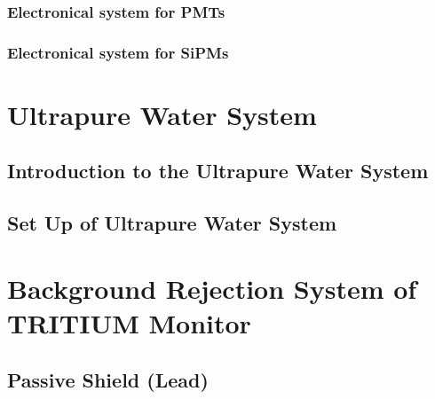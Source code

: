 \documentclass[12pt,a4paper]{book}
\begin{document}
			\subsubsection[Electronic Readout for PMTs]{Electronical system for PMTs}\label{subsubsec:PMTsElectronicalSystem}
			
			
			\subsubsection[Electronic Readout for SiPMs]{Electronical system for SiPMs}\label{subsubsec:SiPMsElectronicalSystem}
			
		
	\section{Ultrapure Water System}\label{sec:UltraPureWaterSystem}
		
		\subsection[Introduction to the Water System]{Introduction to the Ultrapure Water System}\label{subsec:IntroductionWaterSystem}
		 
					
		\subsection[Water System Set Up]{Set Up of Ultrapure Water System}\label{subsec:SetUpWaterSystem}
		
	
	\section[Background Rejection System]{Background Rejection System of TRITIUM Monitor}\label{sec:IntroductionBackground}
	 
	
		\subsection{Passive Shield (Lead)}\label{subsec:SetUpPassiveShield}
		
		
\end{document}
